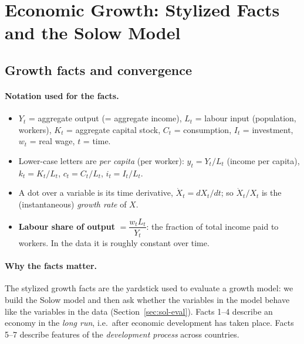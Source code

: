 \section{Economic Growth: Stylized Facts and the Solow Model}

\subsection{Growth facts and convergence }

\paragraph{Notation used for the facts.}
\begin{itemize}
  \item $Y_t$ = aggregate output (= aggregate income), $L_t$ = labour input (population, workers), $K_t$ = aggregate capital stock, $C_t$ = consumption, $I_t$ = investment, $w_t$ = real wage, $t$ = time.
  \item Lower-case letters are \emph{per capita} (per worker): $y_t = Y_t/L_t$ (income per capita), $k_t=K_t/L_t$, $c_t = C_t/L_t$, $i_t = I_t/L_t$.
  \item A dot over a variable is its time derivative, $\dot X_t = dX_t/dt$; so $\dot X_t/X_t$ is the (instantaneous) \emph{growth rate} of $X$.
  \item \textbf{Labour share of output} $= \dfrac{w_tL_t}{Y_t}$: the fraction of total income paid to workers. In the data it is roughly constant over time.
\end{itemize}

\paragraph{Why the facts matter.} The stylized growth facts are the yardstick used to evaluate a growth model: we build the Solow model and then ask whether the variables in the model behave like the variables in the data (Section~\ref{sec:sol-eval}). Facts 1--4 describe an economy in the \emph{long run}, i.e.\ after economic development has taken place. Facts 5--7 describe features of the \emph{development process} across countries.

